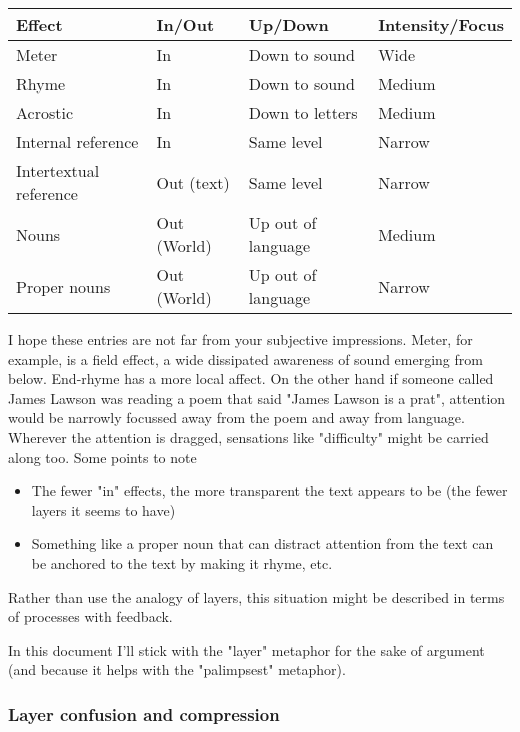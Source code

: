 \documentclass[11pt]{article}
\begin{document}
\begin{table}[htbp]
\centering
\begin{tabular}{|l|l|l|l|}\hline
\textbf{Effect} & \textbf{In/Out} & \textbf{Up/Down} & \textbf{Intensity/Focus}\\\hline
Meter & In & Down to sound & Wide\\
Rhyme & In & Down to sound & Medium\\
Acrostic & In & Down to letters & Medium\\
Internal reference & In & Same level & Narrow\\
Intertextual reference & Out (text) & Same level & Narrow\\
Nouns & Out (World) & Up out of language & Medium\\
Proper nouns & Out (World) & Up out of language & Narrow\\\hline
\end{tabular}
\end{table}

I hope  these entries are not far from
your subjective impressions. Meter, for example, is a field effect, a 
wide dissipated awareness of sound emerging from below. End-rhyme has a more
  local affect. On the other hand if someone
called James Lawson was reading a poem that said "James Lawson is a
prat", attention would be narrowly focussed away from the poem and away from
  language. Wherever the attention is dragged, sensations like "difficulty"
might be carried along too.
Some points to note


\begin{itemize}
\item The fewer "in" effects, the more transparent the text appears to be (the
  fewer layers it seems to have)
\item Something like a proper noun that can distract attention from the text
can be anchored to the text by making it rhyme, etc.
\end{itemize} 


Rather than use the analogy of layers, this situation might be described in terms of processes with feedback. 




In this document I'll stick with the "layer" metaphor for the sake of argument
(and because it helps with the "palimpsest" metaphor).


\subsubsection*{Layer confusion and compression}
\end{document}

